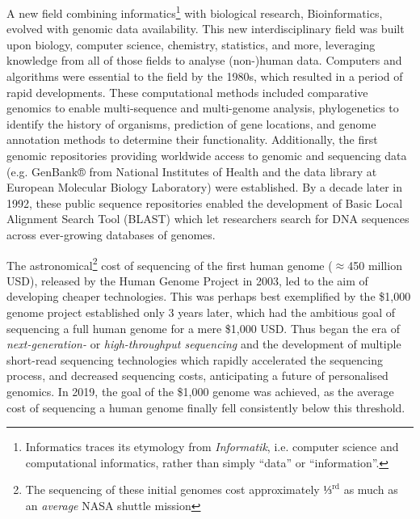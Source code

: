 A new field combining informatics\footnote{Informatics traces its etymology from \textit{Informatik}, i.e. computer science and computational informatics, rather than simply ``data'' or ``information''.} with biological research, Bioinformatics, evolved with genomic data availability.
This new interdisciplinary field was built upon biology, computer science, chemistry, statistics, and more, leveraging knowledge from all of those fields to analyse (non-)human data.
Computers and algorithms were essential to the field by the 1980s, which resulted in a period of rapid developments\cite{Ouzounis_2003}.
These computational methods included comparative genomics to enable multi-sequence and multi-genome analysis\cite{Gibbs_1970,Wagner_1974,Higgins_1988}, phylogenetics to identify the history of organisms\cite{Neyman_1971,Felsenstein_1981}, prediction of gene locations\cite{Gribskov_1984,Guig__1992}, and genome annotation methods to determine their functionality\cite{Gribskov_1987,Del_age_1988}. Additionally, the first genomic repositories providing worldwide access to genomic and sequencing data (e.g. GenBank® from National Institutes of Health\cite{Bilofsky_1988} and the data library at European Molecular Biology Laboratory\cite{Rice_1993,Attwood_2011}) were established.
By a decade later in 1992, these public sequence repositories enabled the development of Basic Local Alignment Search Tool (BLAST)\cite{Altschul_1990} which let researchers search for DNA sequences across ever-growing databases of genomes.


The astronomical\footnote{The sequencing of these initial genomes cost approximately $\text{⅓}^{\text{rd}}$ as much as an \emph{average} NASA shuttle mission\cite{Pielke_2011}} cost of sequencing of the first human genome ($\approx$450 million USD), released by the Human Genome Project in 2003, led to the aim of developing cheaper technologies. This was perhaps best exemplified by the \$1,000 genome project\cite{Mardis_2006,Service_2006,Check_Hayden_2014} established only 3 years later, which had the ambitious goal of sequencing a full human genome for a mere \$1,000 USD.
Thus began the era of \emph{next-generation-} or \emph{high-throughput sequencing} and the development of multiple short-read sequencing technologies which rapidly accelerated the sequencing process, and decreased sequencing costs, anticipating a future of personalised genomics\cite{Voelkerding_2009,Mardis_2008}.
In 2019, the goal of the \$1,000 genome was achieved, as the average cost of sequencing a human genome finally fell consistently below this threshold\cite{genome-cost}.

